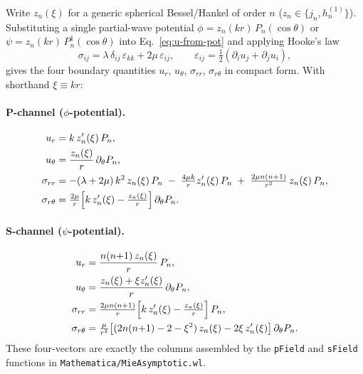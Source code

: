 \documentclass[11pt,a4paper]{article}
\newcommand{\code}[1]{\texttt{#1}}
\begin{document}
Write $z_n(\xi)$ for a generic spherical Bessel/Hankel of order $n$
($z_n\in\{j_n,h_n^{(1)}\}$).  Substituting a single partial-wave
potential
$\phi=z_n(kr)\,P_n(\cos\theta)$ or $\psi=z_n(kr)\,P_n^1(\cos\theta)$
into Eq.~\eqref{eq:u-from-pot} and applying Hooke's law
\begin{equation}
\sigma_{ij} = \lambda\,\delta_{ij}\,\varepsilon_{kk} + 2\mu\,\varepsilon_{ij},
\qquad
\varepsilon_{ij} = \tfrac{1}{2}(\partial_i u_j + \partial_j u_i),
\label{eq:hooke}
\end{equation}
gives the four boundary quantities $u_r$, $u_\theta$, $\sigma_{rr}$,
$\sigma_{r\theta}$ in compact form.  With shorthand $\xi\equiv kr$:

\paragraph{P-channel ($\phi$-potential).}
\begin{equation}
\begin{aligned}
u_r &= k\,z_n'(\xi)\,P_n, \\
u_\theta &= \frac{z_n(\xi)}{r}\,\partial_\theta P_n, \\
\sigma_{rr} &= -(\lambda+2\mu)\,k^2\,z_n(\xi)\,P_n
              \;-\;\tfrac{4\mu k}{r}z_n'(\xi)\,P_n
              \;+\;\tfrac{2\mu n(n{+}1)}{r^2}\,z_n(\xi)\,P_n, \\
\sigma_{r\theta} &= \tfrac{2\mu}{r}\Bigl[k\,z_n'(\xi) - \tfrac{z_n(\xi)}{r}\Bigr]\,\partial_\theta P_n.
\end{aligned}
\label{eq:p-fields}
\end{equation}

\paragraph{S-channel ($\psi$-potential).}
\begin{equation}
\begin{aligned}
u_r &= \frac{n(n{+}1)\,z_n(\xi)}{r}\,P_n, \\
u_\theta &= \frac{z_n(\xi) + \xi z_n'(\xi)}{r}\,\partial_\theta P_n, \\
\sigma_{rr} &= \tfrac{2\mu n(n{+}1)}{r}\Bigl[k\,z_n'(\xi) - \tfrac{z_n(\xi)}{r}\Bigr]\,P_n, \\
\sigma_{r\theta} &= \tfrac{\mu}{r^2}\bigl[(2n(n{+}1)-2-\xi^2)\,z_n(\xi) - 2\xi\,z_n'(\xi)\bigr]\,\partial_\theta P_n.
\end{aligned}
\label{eq:s-fields}
\end{equation}
These four-vectors are exactly the columns assembled by the
\code{pField} and \code{sField} functions in
\code{Mathematica/MieAsymptotic.wl}.
\end{document}
